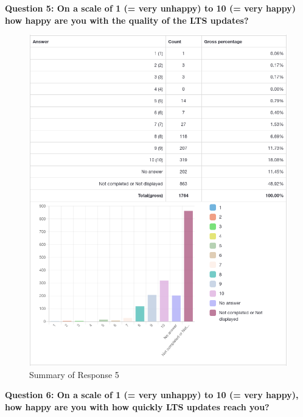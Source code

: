 \documentclass{article}
\begin{document}
\newpage

\Large{\textbf{Question 5: On a scale of 1 (= very unhappy) to 10 (= very happy) how happy are you with
the quality of the LTS updates?}}

\vspace{3mm}
\begin{figure}[h!]
\centering
\includegraphics[width=16.3cm]{assets/5-summary.png}
\caption{Summary of Response 5}
\end{figure}

\newpage

\large{\textbf{Question 6: On a scale of 1 (= very unhappy) to 10 (= very happy), how happy are you with
how quickly LTS updates reach you?}}
\end{document}
